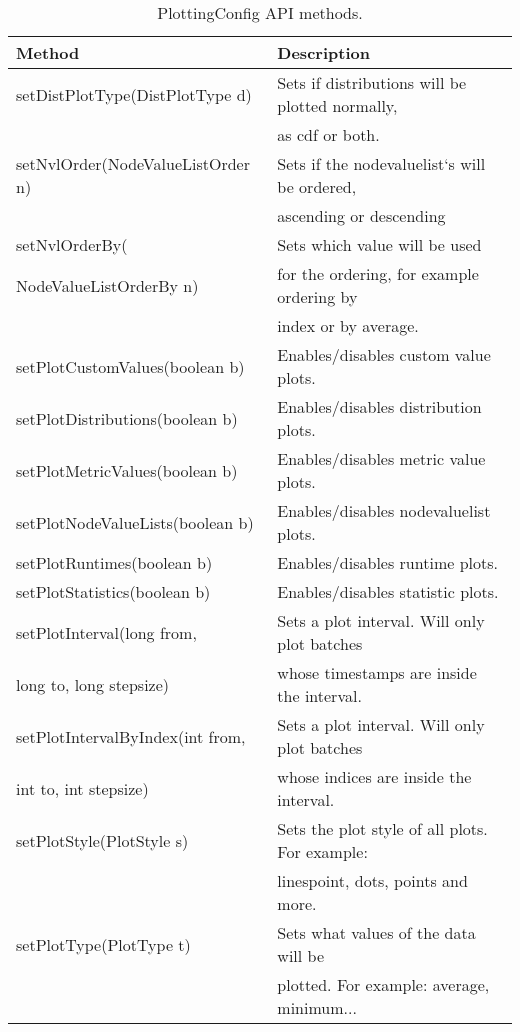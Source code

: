 \begin{table}[h]
\centering
\begin{tabular}[h]{|l|l|}\hline
	\textbf{Method} & \textbf{Description}\\
	\hline
	setDistPlotType(DistPlotType d) & Sets if distributions will be plotted 	normally,\\
	& as cdf or both.\\
	\hline
	setNvlOrder(NodeValueListOrder n) & Sets if the nodevaluelist‘s will be 	ordered,\\
	& ascending or descending\\
	\hline
	setNvlOrderBy( & Sets which value will be used\\
	NodeValueListOrderBy n) & for the ordering, for example ordering by\\
	& index or by average.\\
	\hline
	setPlotCustomValues(boolean b) & Enables/disables custom value plots.\\
	\hline
	setPlotDistributions(boolean b) & Enables/disables distribution plots.\\
	\hline
	setPlotMetricValues(boolean b) & Enables/disables metric value plots.\\
	\hline
	setPlotNodeValueLists(boolean b) & Enables/disables nodevaluelist plots.\\
	\hline
	setPlotRuntimes(boolean b) & Enables/disables runtime plots.\\
	\hline
	setPlotStatistics(boolean b) & Enables/disables statistic plots.\\
	\hline
	setPlotInterval(long from, & Sets a plot interval. Will only plot batches\\
	long to, long stepsize) & whose timestamps are inside the interval.\\
	\hline
	setPlotIntervalByIndex(int from, & Sets a plot interval. Will only plot batches\\
	int to, int stepsize) & whose indices are inside the interval.\\
	\hline
	setPlotStyle(PlotStyle s) & Sets the plot style of all plots. For example:\\
	& linespoint, dots, points and more.\\
	\hline
	setPlotType(PlotType t) & Sets what values of the data will be\\
	& plotted. For example: average, minimum...\\
	\hline
\end{tabular}
\caption{PlottingConfig API methods.}
\label{tab:plot-methods}
\end{table}

